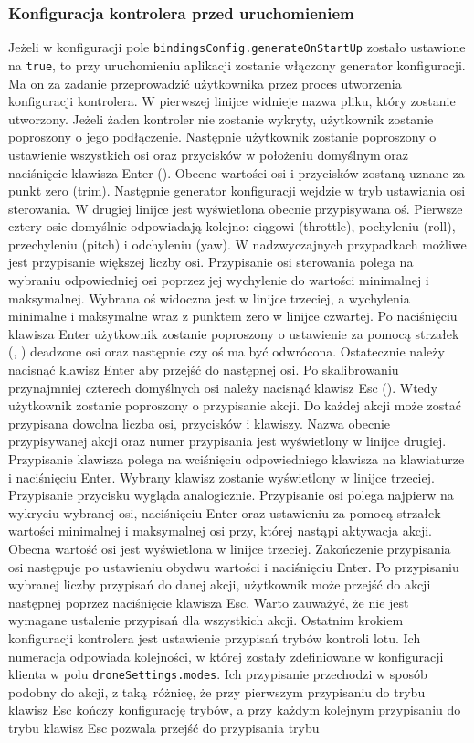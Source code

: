 \documentclass[15pt]{sprawozdanie}
\begin{document}
\subsubsection{Konfiguracja kontrolera przed uruchomieniem}

Jeżeli w konfiguracji pole \texttt{bindingsConfig.generateOnStartUp} zostało ustawione na \texttt{true}, to przy uruchomieniu aplikacji zostanie włączony generator konfiguracji. Ma on za zadanie przeprowadzić użytkownika przez proces utworzenia konfiguracji kontrolera. W pierwszej linijce widnieje nazwa pliku, który zostanie utworzony. Jeżeli żaden kontroler nie zostanie wykryty, użytkownik zostanie poproszony o jego podłączenie. Następnie użytkownik zostanie poproszony o ustawienie wszystkich osi oraz przycisków w położeniu domyślnym oraz naciśnięcie klawisza Enter (\keys{\return}). Obecne wartości osi i przycisków zostaną uznane za punkt zero (trim). Następnie generator konfiguracji wejdzie w tryb ustawiania osi sterowania. W drugiej linijce jest wyświetlona obecnie przypisywana oś. Pierwsze cztery osie domyślnie odpowiadają kolejno: ciągowi (throttle), pochyleniu (roll), przechyleniu (pitch) i odchyleniu (yaw). W nadzwyczajnych przypadkach możliwe jest przypisanie większej liczby osi. Przypisanie osi sterowania polega na wybraniu odpowiedniej osi poprzez jej wychylenie do wartości minimalnej i maksymalnej. Wybrana oś widoczna jest w linijce trzeciej, a wychylenia minimalne i maksymalne wraz z punktem zero w linijce czwartej. Po naciśnięciu klawisza Enter użytkownik zostanie poproszony o ustawienie za pomocą strzałek (\keys{\ \arrowkeyleft}, \keys{\arrowkeyright}) deadzone osi oraz następnie czy oś ma być odwrócona. Ostatecznie należy nacisnąć klawisz Enter aby przejść do następnej osi. Po skalibrowaniu przynajmniej czterech domyślnych osi należy nacisnąć klawisz Esc (\keys{\esc}). Wtedy użytkownik zostanie poproszony o przypisanie akcji. Do każdej akcji może zostać przypisana dowolna liczba osi, przycisków i klawiszy. Nazwa obecnie przypisywanej akcji oraz numer przypisania jest wyświetlony w linijce drugiej. Przypisanie klawisza polega na wciśnięciu odpowiedniego klawisza na klawiaturze i naciśnięciu Enter. Wybrany klawisz zostanie wyświetlony w linijce trzeciej. Przypisanie przycisku wygląda analogicznie. Przypisanie osi polega najpierw na wykryciu wybranej osi, naciśnięciu Enter oraz ustawieniu za pomocą strzałek wartości minimalnej i maksymalnej osi przy, której nastąpi aktywacja akcji. Obecna wartość osi jest wyświetlona w linijce trzeciej. Zakończenie przypisania osi następuje po ustawieniu obydwu wartości i naciśnięciu Enter. Po przypisaniu wybranej liczby przypisań do danej akcji, użytkownik może przejść do akcji następnej poprzez naciśnięcie klawisza Esc. Warto zauważyć, że nie jest wymagane ustalenie przypisań dla wszystkich akcji. Ostatnim krokiem konfiguracji kontrolera jest ustawienie przypisań trybów kontroli lotu. Ich numeracja odpowiada kolejności, w której zostały zdefiniowane w konfiguracji klienta w polu \texttt{droneSettings.modes}. Ich przypisanie przechodzi w sposób podobny do akcji, z taką różnicę, że przy pierwszym przypisaniu do trybu klawisz Esc kończy konfigurację trybów, a przy każdym kolejnym przypisaniu do trybu klawisz Esc pozwala przejść do przypisania trybu 
\end{document}
